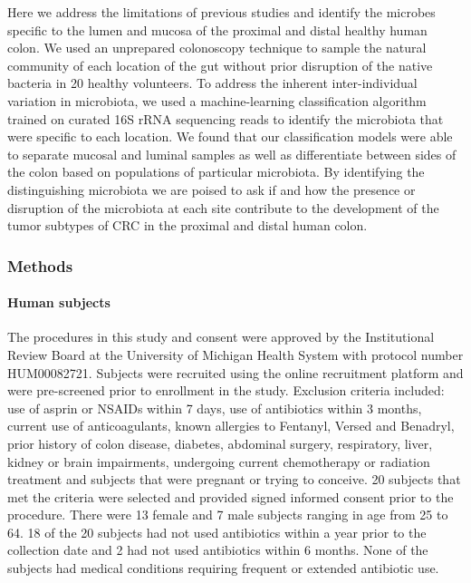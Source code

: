 \documentclass[12pt,]{article}
\let\oldparagraph\paragraph
\renewcommand{\paragraph}[1]{\oldparagraph{#1}\mbox{}}
\begin{document}
Here we address the limitations of previous studies and identify the
microbes specific to the lumen and mucosa of the proximal and distal
healthy human colon. We used an unprepared colonoscopy technique to
sample the natural community of each location of the gut without prior
disruption of the native bacteria in 20 healthy volunteers. To address
the inherent inter-individual variation in microbiota, we used a
machine-learning classification algorithm trained on curated 16S rRNA
sequencing reads to identify the microbiota that were specific to each
location. We found that our classification models were able to separate
mucosal and luminal samples as well as differentiate between sides of
the colon based on populations of particular microbiota. By identifying
the distinguishing microbiota we are poised to ask if and how the
presence or disruption of the microbiota at each site contribute to the
development of the tumor subtypes of CRC in the proximal and distal
human colon.

\subsubsection{Methods}\label{methods}

\paragraph{Human subjects}\label{human-subjects}

The procedures in this study and consent were approved by the
Institutional Review Board at the University of Michigan Health System
with protocol number HUM00082721. Subjects were recruited using the
online recruitment platform and were pre-screened prior to enrollment in
the study. Exclusion criteria included: use of asprin or NSAIDs within 7
days, use of antibiotics within 3 months, current use of anticoagulants,
known allergies to Fentanyl, Versed and Benadryl, prior history of colon
disease, diabetes, abdominal surgery, respiratory, liver, kidney or
brain impairments, undergoing current chemotherapy or radiation
treatment and subjects that were pregnant or trying to conceive. 20
subjects that met the criteria were selected and provided signed
informed consent prior to the procedure. There were 13 female and 7 male
subjects ranging in age from 25 to 64. 18 of the 20 subjects had not
used antibiotics within a year prior to the collection date and 2 had
not used antibiotics within 6 months. None of the subjects had medical
conditions requiring frequent or extended antibiotic use.
\end{document}

